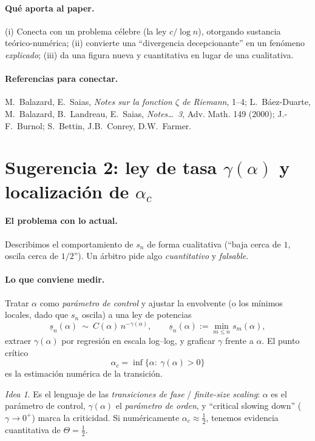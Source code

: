 \documentclass[11pt]{article}
\theoremstyle{plain}
\theoremstyle{definition}
\theoremstyle{remark}
\newtheorem*{idea}{Idea}
\begin{document}
\paragraph{Qu\'e aporta al paper.} (i) Conecta con un problema c\'elebre (la ley $c/\log n$),
otorgando sustancia te\'orico-num\'erica; (ii) convierte una ``divergencia decepcionante'' en un
fen\'omeno \emph{explicado}; (iii) da una figura nueva y cuantitativa en lugar de una cualitativa.

\paragraph{Referencias para conectar.}
M.~Balazard, E.~Saias, \emph{Notes sur la fonction $\zeta$ de Riemann}, 1--4;
L.~B\'aez-Duarte, M.~Balazard, B.~Landreau, E.~Saias, \emph{Notes\ldots\ 3}, Adv. Math. 149 (2000);
J.-F.~Burnol; S.~Bettin, J.B.~Conrey, D.W.~Farmer.

\bigskip

\section*{Sugerencia 2: ley de tasa $\gamma(\alpha)$ y localizaci\'on de $\alpha_c$}

\paragraph{El problema con lo actual.} Describimos el comportamiento de $s_n$ de forma cualitativa
(``baja cerca de $1$, oscila cerca de $1/2$''). Un \'arbitro pide algo \emph{cuantitativo} y
\emph{falsable}.

\paragraph{Lo que conviene medir.} Tratar $\alpha$ como \emph{par\'ametro de control} y ajustar la
envolvente (o los m\'inimos locales, dado que $s_n$ oscila) a una ley de potencias
\[
\underline{s}_n(\alpha)\ \sim\ C(\alpha)\,n^{-\gamma(\alpha)},
\qquad \underline{s}_n(\alpha):=\min_{m\le n}s_m(\alpha),
\]
extraer $\gamma(\alpha)$ por regresi\'on en escala log--log, y graficar $\gamma$ frente a $\alpha$.
El punto cr\'itico
\[
\alpha_c=\inf\{\alpha:\ \gamma(\alpha)>0\}
\]
es la estimaci\'on num\'erica de la transici\'on.

\begin{idea}
Es el lenguaje de las \emph{transiciones de fase} / \emph{finite-size scaling}: $\alpha$ es el
par\'ametro de control, $\gamma(\alpha)$ el \emph{par\'ametro de orden}, y ``critical slowing
down'' ($\gamma\to0^{+}$) marca la criticidad. Si num\'ericamente $\alpha_c\approx\tfrac12$,
tenemos evidencia cuantitativa de $\Theta=\tfrac12$.
\end{idea}
\end{document}
